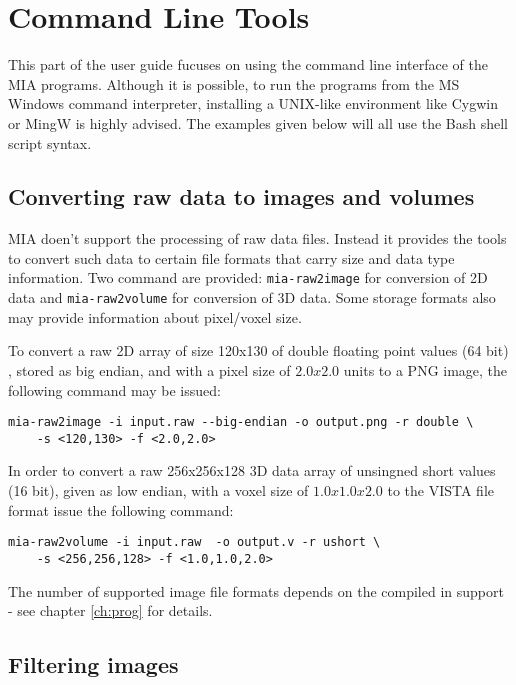\section{Command Line Tools}

This part of the user guide fucuses on using the command line interface of the MIA programs. 
Although it is possible, to run the programs from the MS Windows command interpreter, installing 
  a UNIX-like environment like Cygwin or MingW is highly advised. 
The examples given below will all use the Bash shell script syntax. 

\subsection{Converting raw data to images and volumes}

MIA doen't support the processing of raw data files. 
Instead it provides the tools to convert such data to certain file formats that carry size and data type information. 
Two command are provided: \texttt{mia-raw2image} for conversion of 2D data and \texttt{mia-raw2volume} for conversion of 3D data. 
Some storage formats also may provide information about pixel/voxel size. 

To convert a raw 2D array of size 120x130 of double floating point values (64 bit) , stored as big endian, and 
  with a pixel size of $2.0 x 2.0$ units to a PNG image, the following command may be issued: 
\lstset{language=bash}
\begin{lstlisting}
mia-raw2image -i input.raw --big-endian -o output.png -r double \
	-s <120,130> -f <2.0,2.0> 
\end{lstlisting}

\noindent 
In order to convert a raw 256x256x128 3D data array of unsingned short values (16 bit), given as low endian, with a voxel size of $1.0 x 1.0 x 2.0$ 
  to the VISTA file format issue the following command: 
\begin{lstlisting}
mia-raw2volume -i input.raw  -o output.v -r ushort \
	-s <256,256,128> -f <1.0,1.0,2.0>
\end{lstlisting}

\noindent 
The number of supported image file formats depends on the compiled in support - see chapter \ref{ch:prog} for details. 

\subsection{Filtering images}

